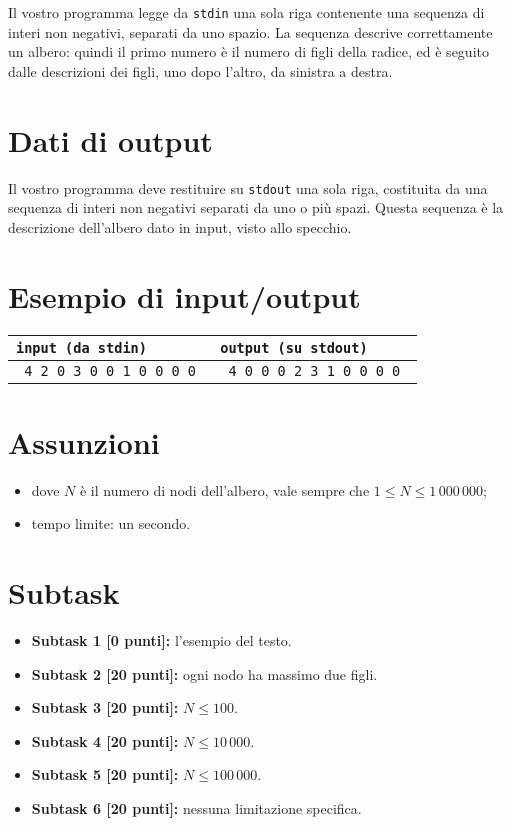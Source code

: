 \documentclass[a4paper,11pt]{article}
\newcommand{\file}[1]{\texttt{#1}}
\newcommand{\esempio}[2]{
\noindent\begin{minipage}{\textwidth}
\begin{tabular}{|p{11cm}|p{5cm}|}
	\hline
      \textbf{\file{input (da stdin)}} & \textbf{\file{output (su stdout)}}\\
	\hline
	\tt \small #1 &
	\tt \small #2 \\
	\hline
\end{tabular}
\end{minipage}
}
\begin{document}
Il vostro programma legge da \verb'stdin' una sola riga contenente una sequenza di interi non negativi, separati da uno spazio. La sequenza descrive correttamente un albero: quindi il primo numero \`e il numero di figli della radice, ed \`e seguito dalle descrizioni dei figli, uno dopo l'altro, da sinistra a destra.

\section*{Dati di output}

Il vostro programma deve restituire su \verb'stdout' una sola riga, costituita da una sequenza di interi non negativi separati da uno o pi\`u spazi. Questa sequenza \`e la descrizione dell'albero dato in input, visto allo specchio.

\section*{Esempio di input/output}
\esempio{
4 2 0 3 0 0 1 0 0 0 0
}{
4 0 0 0 2 3 1 0 0 0 0
}

\section*{Assunzioni}
\begin{itemize}[nolistsep, noitemsep]
\item dove $N$ \`e il numero di nodi dell'albero,
      vale sempre che $1 \le N \le 1\,000\,000 $;
\item tempo limite: un secondo.
\end{itemize}

\section*{Subtask}
\begin{itemize}
\item \textbf{Subtask 1 [0 punti]:} l'esempio del testo.
\item \textbf{Subtask 2 [20 punti]:} ogni nodo ha massimo due figli.
\item \textbf{Subtask 3 [20 punti]:} $N \le 100$.
\item \textbf{Subtask 4 [20 punti]:} $N \le 10\,000$.
\item \textbf{Subtask 5 [20 punti]:} $N \le 100\,000$.
\item \textbf{Subtask 6 [20 punti]:} nessuna limitazione specifica.
\end{itemize}
\end{document}
